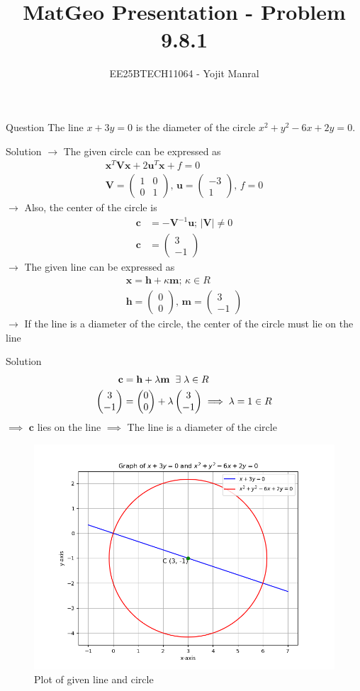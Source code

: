 \documentclass{beamer}
\title{MatGeo Presentation - Problem 9.8.1}
\author{EE25BTECH11064 - Yojit Manral}
\date{}
\numberwithin{equation}{section}
\theoremstyle{remark}
\newcommand{\myvec}[1]{\ensuremath{\begin{pmatrix}#1\end{pmatrix}}}
\let\vec\mathbf
\begin{document}
\frame{\titlepage}
\begin{frame}{Question}
The line $x + 3y = 0$ is the diameter of the circle $x^2 + y^2 - 6x + 2y = 0$.
\end{frame}

\begin{frame}{Solution}
$\rightarrow$ The given circle can be expressed as
\begin{align}
    \vec{x}^T\vec{V}\vec{x} + 2\vec{u}^T\vec{x} + f = 0 \\
    \vec{V} = \myvec{1&0\\0&1}\text{, } \vec{u} = \myvec{-3\\1}\text{, } f = 0
\end{align}
$\rightarrow$ Also, the center of the circle is
\begin{align}
    \vec{c} &= -\vec{V}^{-1}\vec{u}\text{; } |\vec{V}| \neq 0 \\
    \vec{c} &= \myvec{3\\-1}
\end{align}
$\rightarrow$ The given line can be expressed as
\begin{align}
    \vec{x} = \vec{h} + \kappa\vec{m}\text{; } \kappa \in R\\
    \vec{h} = \myvec{0\\0}\text{, } \vec{m} = \myvec{3\\-1}
\end{align}
$\rightarrow$ If the line is a diameter of the circle, the center of the circle must lie on the line
\end{frame}

\begin{frame}{Solution}
\begin{align}
    \vec{c} &= \vec{h} + \lambda \vec{m} \hspace{0.2cm} \exists \hspace{0.1cm} \lambda \in R \\
    \myvec{3\\-1} &= \myvec{0\\0} + \lambda \myvec{3\\-1} \implies \lambda = 1 \in R
\end{align}
$\implies$ $\vec{c}$ lies on the line $\implies$ The line is a diameter of the circle
\begin{figure}[h!]
   \centering
   \includegraphics[width=0.54\linewidth]{figs/01.png}
   \caption{Plot of given line and circle}
   \label{Plot_1}
\end{figure}
\end{frame}
\end{document}
